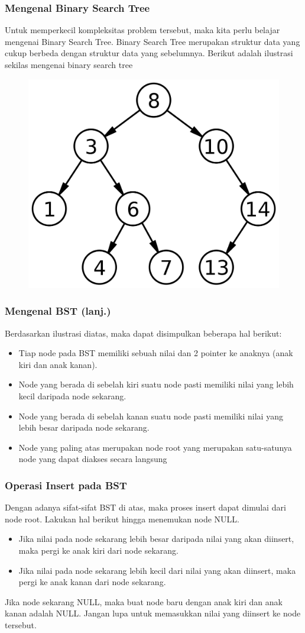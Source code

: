 \begin{frame}
\frametitle{Mengenal Binary Search Tree}
Untuk memperkecil kompleksitas problem tersebut, maka kita perlu belajar mengenai Binary Search Tree. Binary Search Tree merupakan struktur data yang cukup berbeda dengan struktur data yang sebelumnya. Berikut adalah ilustrasi sekilas mengenai binary search tree

\begin{figure}
	\centering
	\includegraphics[width=4 cm]{asset/bst.png}
\end{figure}
\end{frame}

\begin{frame}
\frametitle{Mengenal BST (lanj.)}
Berdasarkan ilustrasi diatas, maka dapat disimpulkan beberapa hal berikut:
\begin{itemize}
	\item Tiap node pada BST memiliki sebuah nilai dan 2 pointer ke anaknya (anak kiri dan anak kanan).
	\item Node yang berada di sebelah kiri suatu node pasti memiliki nilai yang lebih kecil daripada node sekarang.
	\item Node yang berada di sebelah kanan suatu node pasti memiliki nilai yang lebih besar daripada node sekarang.
	\item Node yang paling atas merupakan node \alert{root} yang merupakan satu-satunya node yang dapat diakses secara langsung
\end{itemize}
\end{frame}

\begin{frame}
\frametitle{Operasi Insert pada BST}

Dengan adanya sifat-sifat BST di atas, maka proses insert dapat dimulai dari node root. Lakukan hal berikut hingga menemukan node NULL.
\begin{itemize}
	\item Jika nilai pada node sekarang lebih besar daripada nilai yang akan diinsert, maka pergi ke anak kiri dari node sekarang.
	\item Jika nilai pada node sekarang lebih kecil dari nilai yang akan diinsert, maka pergi ke anak kanan dari node sekarang.\newline
\end{itemize}

Jika node sekarang NULL, maka buat node baru dengan anak kiri dan anak kanan adalah NULL. Jangan lupa untuk memasukkan nilai yang diinsert ke node tersebut.
\end{frame}

